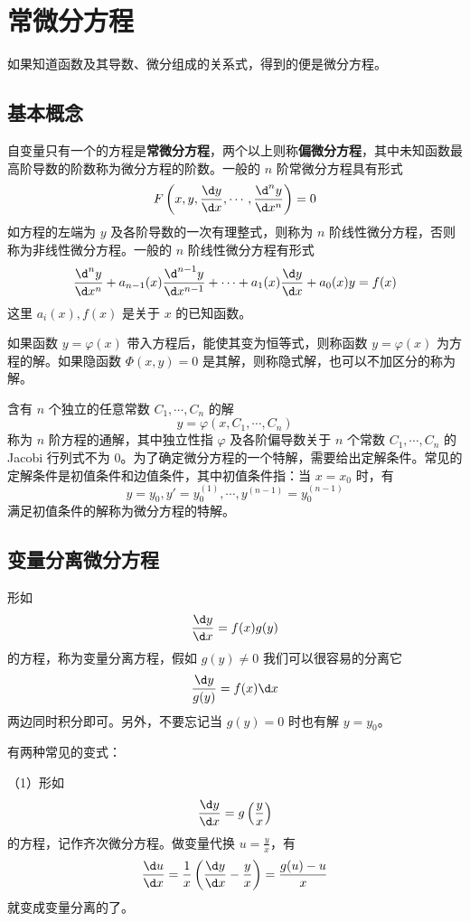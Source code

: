 \chapter{常微分方程}

如果知道函数及其导数、微分组成的关系式，得到的便是微分方程。

\section{基本概念}

自变量只有一个的方程是\textbf{常微分方程}，两个以上则称\textbf{偏微分方程}，其中未知函数最高阶导数的阶数称为微分方程的阶数。一般的 $n$ 阶常微分方程具有形式
\[ F\left(x, y, \frac{\d y}{\d x}, \cdots, \frac{\d^n y}{\d x^n} \right) = 0 \]
如方程的左端为 $y$ 及各阶导数的一次有理整式，则称为 $n$ 阶线性微分方程，否则称为非线性微分方程。一般的 $n$ 阶线性微分方程有形式
\[ \frac{\d^n y}{\d x^n} + a_{n-1}(x) \frac{\d^{n-1} y}{\d x^{n-1}} + \cdots + a_1(x) \frac{\d y}{\d x} + a_0(x) y = f(x) \]
这里 $a_i(x), f(x)$ 是关于 $x$ 的已知函数。

如果函数 $y = \varphi(x)$ 带入方程后，能使其变为恒等式，则称函数 $y=\varphi(x)$ 为方程的解。如果隐函数 $\Phi(x, y) = 0$ 是其解，则称隐式解，也可以不加区分的称为解。

含有 $n$ 个独立的任意常数 $C_1, \cdots, C_n$ 的解
\[ y = \varphi(x, C_1, \cdots, C_n) \]
称为 $n$ 阶方程的通解，其中独立性指 $\varphi$ 及各阶偏导数关于 $n$ 个常数 $C_1, \cdots, C_n$ 的 Jacobi 行列式不为 $0$。为了确定微分方程的一个特解，需要给出定解条件。常见的定解条件是初值条件和边值条件，其中初值条件指：当 $x = x_0$ 时，有
\[ y=y_0, y' = y_0^{(1)}, \cdots, y^{(n-1)} = y_0^{(n-1)} \]
满足初值条件的解称为微分方程的特解。

\section{变量分离微分方程}

形如
\[ \frac{\d y}{\d x} = f(x) g(y) \]
的方程，称为变量分离方程，假如 $g(y) \neq 0$ 我们可以很容易的分离它
\[ \frac{\d y}{g(y)} = f(x) \d x \]
两边同时积分即可。另外，不要忘记当 $g(y) = 0$ 时也有解 $y=y_0$。

有两种常见的变式：

（1）形如
\[ \frac{\d y}{\d x} = g\left(\frac{y}{x}\right) \]
的方程，记作齐次微分方程。做变量代换 $u = \frac{y}{x}$，有
\[ \frac{\d u}{\d x} = \frac{1}{x} \left(\frac{\d y}{\d x} -\frac{y}{x} \right) = \frac{g(u) - u}{x} \]
就变成变量分离的了。


